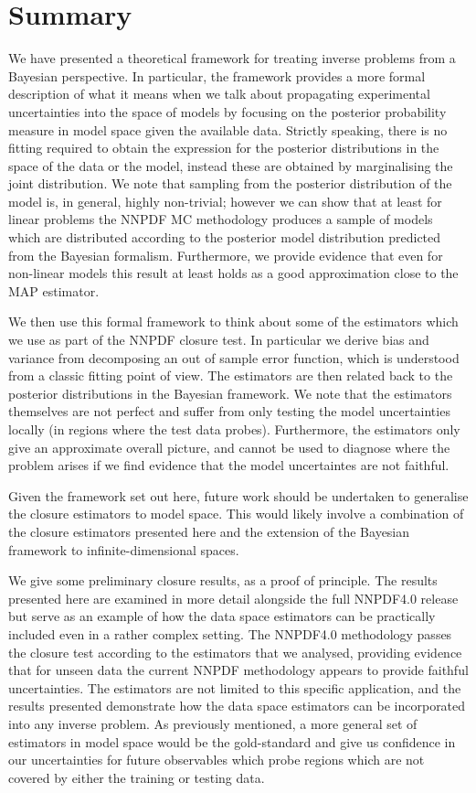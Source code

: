 \section{Summary}

We have presented a theoretical framework for treating inverse problems from a
Bayesian perspective. In particular, the framework provides a more formal
description of what it means when we talk about propagating experimental
uncertainties into the space of models by focusing on the posterior probability
measure in model space given the available data. Strictly speaking, there is no
fitting required to obtain the expression for the posterior distributions in the
space of the data or the model, instead these are obtained by marginalising the
joint distribution. We note that sampling from the posterior distribution of the
model is, in general, highly non-trivial; however we can show that at least for
linear problems the NNPDF MC methodology produces a sample of models which are
distributed according to the posterior model distribution predicted from the
Bayesian formalism. Furthermore, we provide evidence that even for non-linear
models this result at least holds as a good approximation close to the MAP
estimator.

We then use this formal framework to think about some of the estimators which we
use as part of the NNPDF closure test. In particular we derive bias and variance
from decomposing an out of sample error function, which is understood from a
classic fitting point of view. The estimators are then related back to the
posterior distributions in the Bayesian framework. We note that the estimators
themselves are not perfect and suffer from only testing the model uncertainties
locally (in regions where the test data probes). Furthermore, the estimators
only give an approximate overall picture, and cannot be used to diagnose where
the problem arises if we find evidence that the model uncertaintes are not
faithful.

Given the framework set out here, future work should be undertaken to generalise
the closure estimators to model space. This would likely involve a combination
of the closure estimators presented here and the extension of the Bayesian
framework to infinite-dimensional spaces.

We give some preliminary closure results, as a proof of principle. The results
presented here are examined in more detail alongside the full NNPDF4.0
release \cite{NNPDF40} but serve as an example of how the data space
estimators can be
practically included even in a rather complex setting. The NNPDF4.0 methodology
passes the closure test according to the estimators that we analysed, providing
evidence that for unseen data the current NNPDF methodology appears to provide
faithful uncertainties. The estimators are not limited to this specific
application, and the results presented demonstrate how the data space estimators
can be incorporated into any inverse problem. As previously mentioned, a more
general set of estimators in model space would be the gold-standard and give us
confidence in our uncertainties for future observables which probe regions which
are not covered by either the training or testing data.

